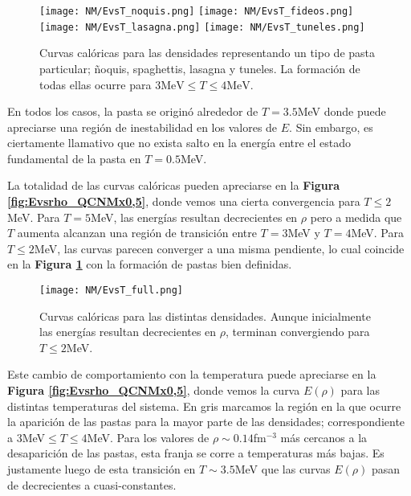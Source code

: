 \begin{figure}[H]
	\centering	%
	\texttt{[image: NM/EvsT\_noquis.png]}
	\texttt{[image: NM/EvsT\_fideos.png]}
	\texttt{[image: NM/EvsT\_lasagna.png]}
	\texttt{[image: NM/EvsT\_tuneles.png]}
	\caption{Curvas calóricas para las densidades representando un tipo de pasta particular; ñoquis, spaghettis, lasagna y tuneles.
	La formación de todas ellas ocurre para $3\text{MeV}\leq T\leq4\text{MeV}$.}
	\label{fig:EvsT_pastas}
\end{figure}

En todos los casos, la pasta se originó alrededor de $T=3.5$MeV donde puede apreciarse una región de inestabilidad en los valores de $E$.
Sin embargo, es ciertamente llamativo que no exista salto en la energía entre el estado fundamental de la pasta en $T=0.5$MeV.

La totalidad de las curvas calóricas pueden apreciarse en la \textbf{Figura \ref{fig:Evsrho_QCNMx0,5}}, donde vemos una cierta convergencia para $T\leq 2$MeV.
Para $T=5$MeV, las energías resultan decrecientes en $\rho$ pero a medida que $T$ aumenta alcanzan una región de transición entre $T=3$MeV y $T=4$MeV.
Para $T\leq2$MeV, las curvas parecen converger a una misma pendiente, lo cual coincide en la \textbf{Figura \ref{fig:EvsT_pastas}} con la formación de pastas bien definidas. 

\begin{figure}[H]
	\centering
	\texttt{[image: NM/EvsT\_full.png]}
	\caption{Curvas calóricas para las distintas densidades. 
	Aunque inicialmente las energías resultan decrecientes en $\rho$, terminan convergiendo para $T\leq 2$MeV.}
	\label{fig:EvsT_QCNMx0,5}
\end{figure}

Este cambio de comportamiento con la temperatura puede apreciarse en la \textbf{Figura \ref{fig:Evsrho_QCNMx0,5}}, donde vemos la curva $E(\rho)$ para  las distintas temperaturas del sistema.
En gris marcamos la región en la que ocurre la aparición de las pastas para la mayor parte de las densidades; correspondiente a $3$MeV$\leq T\leq4$MeV.
Para los valores de $\rho\sim 0.14$fm$^{-3}$ más cercanos a la desaparición de las pastas, esta franja se corre a temperaturas más bajas. 
Es justamente luego de esta transición en $T\sim 3.5$MeV que las curvas $E(\rho)$ pasan de decrecientes a cuasi-constantes.

